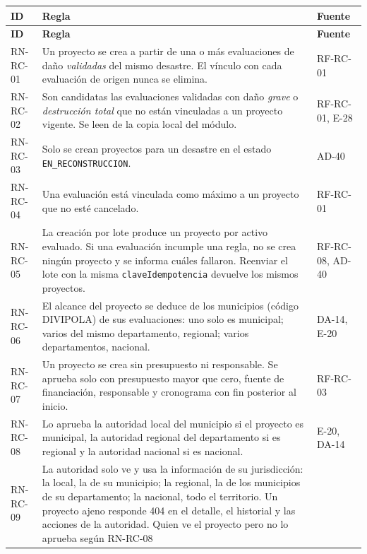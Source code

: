 \documentclass[11pt,a4paper]{article}
\begin{document}
{\small
\begin{longtable}{|P{1.7cm}|P{10.6cm}|P{2.3cm}|}
  \hline
  \textbf{ID} & \textbf{Regla} & \textbf{Fuente} \\ \hline
  \endfirsthead
  \hline
  \textbf{ID} & \textbf{Regla} & \textbf{Fuente} \\ \hline
  \endhead
  RN-RC-01 & Un proyecto se crea a partir de una o más evaluaciones de daño \emph{validadas} del mismo desastre. El
    vínculo con cada evaluación de origen nunca se elimina. & RF-RC-01 \\ \hline
  RN-RC-02 & Son candidatas las evaluaciones validadas con daño \emph{grave} o \emph{destrucción total} que no están
    vinculadas a un proyecto vigente. Se leen de la copia local del módulo. & RF-RC-01, E-28 \\ \hline
  RN-RC-03 & Solo se crean proyectos para un desastre en el estado \texttt{EN\_RECONSTRUCCION}. & AD-40 \\ \hline
  RN-RC-04 & Una evaluación está vinculada como máximo a un proyecto que no esté cancelado. & RF-RC-01 \\ \hline
  RN-RC-05 & La creación por lote produce un proyecto por activo evaluado. Si una evaluación incumple una regla, no se
    crea ningún proyecto y se informa cuáles fallaron. Reenviar el lote con la misma \texttt{claveIdempotencia}
    devuelve los mismos proyectos. & RF-RC-08, AD-40 \\ \hline
  RN-RC-06 & El alcance del proyecto se deduce de los municipios (código DIVIPOLA) de sus evaluaciones: uno solo es
    municipal; varios del mismo departamento, regional; varios departamentos, nacional. & DA-14, E-20 \\ \hline
  RN-RC-07 & Un proyecto se crea sin presupuesto ni responsable. Se aprueba solo con presupuesto mayor que cero,
    fuente de financiación, responsable y cronograma con fin posterior al inicio. & RF-RC-03 \\ \hline
  RN-RC-08 & Lo aprueba la autoridad local del municipio si el proyecto es municipal, la autoridad regional del
    departamento si es regional y la autoridad nacional si es nacional. & E-20, DA-14 \\ \hline
  RN-RC-09 & La autoridad solo ve y usa la información de su jurisdicción: la local, la de su municipio; la regional,
    la de los municipios de su departamento; la nacional, todo el territorio. Un proyecto ajeno responde 404 en el
    detalle, el historial y las acciones de la autoridad. Quien ve el proyecto pero no lo aprueba según RN-RC-08

\end{longtable}}
\end{document}
